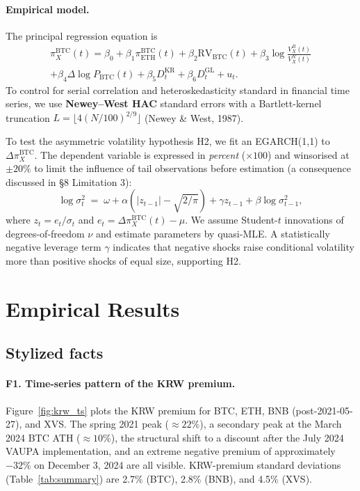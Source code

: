 \documentclass[11pt,a4paper]{article}
\begin{document}
\paragraph{Empirical model.}
The principal regression equation is
\begin{multline}
\pi^{\text{BTC}}_X(t) = \beta_0 + \beta_1\pi^{\text{BTC}}_{\text{ETH}}(t) + \beta_2\text{RV}_{\text{BTC}}(t)
                       + \beta_3\log\!\tfrac{V_X^B(t)}{V_X^N(t)} \\
                       + \beta_4\Delta\log P_{\text{BTC}}(t)
                       + \beta_5 D^{\text{KR}}_t + \beta_6 D^{\text{GL}}_t + u_t.
\label{eq:reg}
\end{multline}
To control for serial correlation and heteroskedasticity standard in financial time series, we use
\textbf{Newey--West HAC} standard errors with a Bartlett-kernel truncation
$L=\lfloor 4(N/100)^{2/9}\rfloor$ (Newey \& West, 1987).

To test the asymmetric volatility hypothesis H2, we fit an EGARCH(1,1) to $\Delta\pi^{\text{BTC}}_X$.
The dependent variable is expressed in \emph{percent} ($\times 100$) and winsorised at $\pm 20\%$ to
limit the influence of tail observations before estimation (a consequence discussed in
\S 8 Limitation 3):
\begin{equation}
\log\sigma_t^2 \;=\; \omega + \alpha\!\left(|z_{t-1}|-\sqrt{2/\pi}\right) + \gamma z_{t-1} + \beta\log\sigma_{t-1}^2,
\label{eq:egarch}
\end{equation}
where $z_t=e_t/\sigma_t$ and $e_t=\Delta\pi^{\text{BTC}}_X(t)-\mu$. We assume Student-$t$ innovations
of degrees-of-freedom $\nu$ and estimate parameters by quasi-MLE. A statistically negative leverage
term $\gamma$ indicates that negative shocks raise conditional volatility more than positive shocks
of equal size, supporting H2.

\section{Empirical Results}

\subsection{Stylized facts}

\paragraph{F1. Time-series pattern of the KRW premium.}
Figure~\ref{fig:krw_ts} plots the KRW premium for BTC, ETH, BNB (post-2021-05-27), and XVS. The
spring 2021 peak ($\approx 22\%$), a secondary peak at the March 2024 BTC ATH ($\approx 10\%$), the
structural shift to a discount after the July 2024 VAUPA implementation, and an extreme negative
premium of approximately $-32\%$ on December 3, 2024 are all visible. KRW-premium standard deviations
(Table~\ref{tab:summary}) are 2.7\% (BTC), 2.8\% (BNB), and 4.5\% (XVS).
\end{document}
